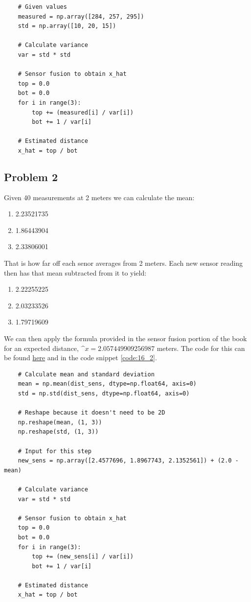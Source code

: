 \documentclass{article}
\begin{document}
\begin{code}
\label{code:16_1}
\begin{verbatim}
    # Given values
    measured = np.array([284, 257, 295])
    std = np.array([10, 20, 15])

    # Calculate variance
    var = std * std

    # Sensor fusion to obtain x_hat
    top = 0.0
    bot = 0.0
    for i in range(3):
        top += (measured[i] / var[i])
        bot += 1 / var[i]

    # Estimated distance
    x_hat = top / bot
\end{verbatim}
\end{code}
\subsection{Problem 2}
Given 40 measurements at 2 meters we can calculate the mean:

\begin{enumerate}[label=\Alph*]
    \item 2.23521735
    \item 1.86443904
    \item 2.33806001
\end{enumerate}

That is how far off each senor averages from 2 meters. Each new sensor reading 
then has that mean subtracted from it to yield:

\begin{enumerate}[label=\Alph*]
    \item 2.22255225
    \item 2.03233526
    \item 1.79719609
\end{enumerate}

We can then apply the formula provided in the sensor fusion portion of the book 
for an expected distance, $\^{x} = 2.057449909256987$ meters. The code for 
this can be found 
\href{https://github.com/macattackftw/RoboticsHW/blob/master/HW5/problem16_2.py}{here} 
and in the code snippet \ref{code:16_2}.

\begin{code}
\label{code:16_2}
\begin{verbatim}
    # Calculate mean and standard deviation
    mean = np.mean(dist_sens, dtype=np.float64, axis=0)
    std = np.std(dist_sens, dtype=np.float64, axis=0)

    # Reshape because it doesn't need to be 2D
    np.reshape(mean, (1, 3))
    np.reshape(std, (1, 3))

    # Input for this step
    new_sens = np.array([2.4577696, 1.8967743, 2.1352561]) + (2.0 - mean)

    # Calculate variance
    var = std * std

    # Sensor fusion to obtain x_hat
    top = 0.0
    bot = 0.0
    for i in range(3):
        top += (new_sens[i] / var[i])
        bot += 1 / var[i]

    # Estimated distance
    x_hat = top / bot
\end{verbatim}
\end{code}
\end{document}
